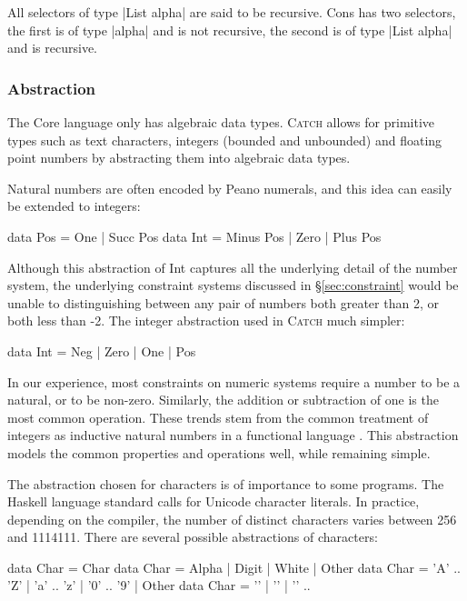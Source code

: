 \documentclass[preprint]{sigplanconf}
\newcommand{\C}[1]{\textsf{#1}}
\newcommand{\catch}{\textsc{Catch}}
\begin{document}
All selectors of type |List alpha| are said to be recursive. \C{Cons} has two selectors, the first is of type |alpha| and is not recursive, the second is of type |List alpha| and is recursive.

\subsubsection{Abstraction}
\label{sec:abstraction}

The Core language only has algebraic data types. \catch{} allows for primitive types such as text characters, integers (bounded and unbounded) and floating point numbers by abstracting them into algebraic data types.

Natural numbers are often encoded by Peano numerals, and this idea can easily be extended to integers:

\begin{code}
data Pos  = One | Succ Pos
data Int  = Minus Pos | Zero | Plus Pos
\end{code}

Although this abstraction of \C{Int} captures all the underlying detail of the number system, the underlying constraint systems discussed in \S\ref{sec:constraint} would be unable to distinguishing between any pair of numbers both greater than 2, or both less than -2. The integer abstraction used in \catch{} much simpler:

\begin{code}
data Int = Neg | Zero | One | Pos
\end{code}

In our experience, most constraints on numeric systems require a number to be a natural, or to be non-zero. Similarly, the addition or subtraction of one is the most common operation. These trends stem from the common treatment of integers as inductive natural numbers in a functional language \citep{runciman:naturals}. This abstraction models the common properties and operations well, while remaining simple.

The abstraction chosen for characters is of importance to some programs. The Haskell language standard calls for Unicode character literals. In practice, depending on the compiler, the number of distinct characters varies between 256 and 1114111. There are several possible abstractions of characters:

\begin{code}
data Char = Char
data Char = Alpha | Digit | White | Other
data Char = 'A' .. 'Z' | 'a' .. 'z' | '0' .. '9' | Other
data Char = '\0' | '\1' | '\2' ..
\end{code}
\end{document}
